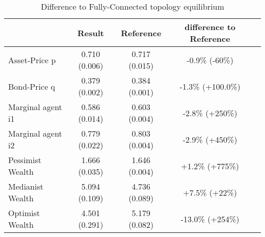 \documentclass[Bachelorarbeit.tex]{subfiles}
\begin{document}
\begin{table}[H]
	\caption{Difference to Fully-Connected topology equilibrium}
	\centering
	\begin{tabular} { l c c c r }
		& Result & Reference & difference to Reference \\
		\hline
		Asset-Price p & 0.710 (0.006) & 0.717 (0.015) & -0.9\% (-60\%) \\
		Bond-Price q & 0.379 (0.002) & 0.384 (0.001) & -1.3\% (+100.0\%) \\
		Marginal agent i1 & 0.586 (0.014) & 0.603 (0.004) & -2.8\% (+250\%) \\
		Marginal agent i2 & 0.779 (0.022) & 0.803 (0.004) & -2.9\% (+450\%) \\
		\hline
		Pessimist Wealth & 1.666 (0.035) & 1.646 (0.004) & +1.2\% (+775\%) \\
		Medianist Wealth & 5.094 (0.109) & 4.736 (0.089) & +7.5\% (+22\%) \\
		Optimist Wealth & 4.501 (0.291) & 5.179 (0.082) & -13.0\% (+254\%) \\
		\hline
	\end{tabular}
\end{table}
\end{document}
